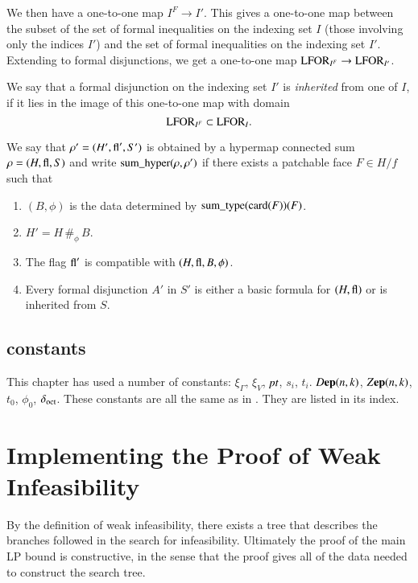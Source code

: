 We then have a one-to-one map $I^F \to I'$.  This gives a
one-to-one map between the subset of the set of formal
inequalities on the indexing set $I$ (those involving only the
indices $I'$) and the set of formal inequalities on the indexing
set $I'$. Extending to formal disjunctions, we get a one-to-one
map ${\operatorname{LFOR}}_{I^F}\to {\operatorname{LFOR}}_{I'}$.

\begin{definition}[inheritance]  We say that a formal disjunction on the
indexing set $I'$ is {\it inherited} from one of $I$, if it lies
in the image of this one-to-one map with domain
    $${\operatorname{LFOR}}_{I^F}\subset {\operatorname{LFOR}}_I.$$
\end{definition}



\begin{definition}
We say that $\rho'=(H',{\operatorname{fl}}',S')$ is obtained by a hypermap
connected sum $\rho =(H,{\operatorname{fl}},S)$  and write
${\operatorname{sum\_hyper}}(\rho,\rho')$ if there exists a patchable face
$F\in H/f$ such that
    \begin{enumerate}
    \item $(B,\phi)$ is the data determined by ${\operatorname{sum\_type}}({\operatorname{card}}(F))(F)$.
    \item $H' = H\,\#_\phi\, B$.
    \item The flag ${\operatorname{fl}}'$ is compatible with $(H,{\operatorname{fl}},B,\phi)$.
    \item Every formal disjunction $A'$ in $S'$ is either a basic
    formula for $(H,{\operatorname{fl}})$ or is inherited from $S$.
    \end{enumerate}
\end{definition}

\subsection{constants}

This chapter has used a number of constants: $\xi_\Gamma$,
$\xi_V$, $\hbox{\it pt}$, $s_i$, $t_i$. $D{\operatorname{\bf ep}}{(n,k)}$, $Z{\operatorname{\bf ep}}{(n,k)}$, $t_0$, $\phi_0$,
$\delta_{\operatorname{oct}}$.
%
These constants are all the same as in \cite{DCG}.  They are
listed in its index.


\section{Implementing the Proof of Weak Infeasibility}

By the definition of weak infeasibility, there exists a tree that
describes the branches followed in the search for infeasibility.
Ultimately the proof of the main LP bound is constructive, in the
sense that the proof gives all of the data needed to construct the
search tree.

